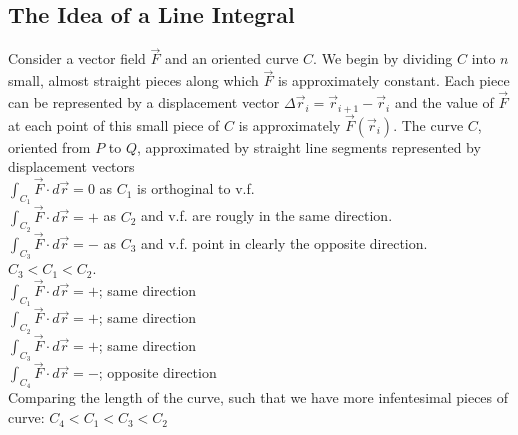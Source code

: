 \documentclass{article}
\begin{document}
\subsection{The Idea of a Line Integral}
Consider a vector field $\vec{F}$ and an oriented curve $C$. We begin by dividing $C$ into $n$ small, almost straight pieces along which $\vec{F}$ is approximately constant. Each piece can be represented by a displacement vector $\Delta \vec{r}_i=\vec{r}_{i+1}-\vec{r}_i$ and the value of $\vec{F}$ at each point of this small piece of $C$ is approximately $\vec{F}\left(\vec{r}_i\right)$.
The curve $C$, oriented from $P$ to $Q$, approximated by straight line segments represented by displacement vectors
\sol \\
$\int_{C_1} \vec{F} \cdot d \vec{r} = 0$  as $C_1$ is orthoginal to v.f. \\
$\int_{C_2} \vec{F} \cdot d \vec{r} = +$  as $C_2$ and v.f. are rougly in the same direction. \\
$\int_{C_3} \vec{F} \cdot d \vec{r} = -$  as $C_3$ and v.f. point in clearly the opposite direction. \\
$C_3 < C_1 < C_2$.
\sol \\
$\int_{C_1} \vec{F} \cdot d \vec{r} = +$; same direction \\
$\int_{C_2} \vec{F} \cdot d \vec{r} = +$; same direction \\
$\int_{C_3} \vec{F} \cdot d \vec{r} = +$; same direction \\
$\int_{C_4} \vec{F} \cdot d \vec{r} = -$; opposite direction \\
Comparing the length of the curve, such that we have more infentesimal pieces of curve:
$ C_4 < C_1 < C_3 < C_2$
\end{document}
